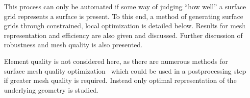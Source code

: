 This process can only be automated if some way of judging ``how well'' a
surface grid represents a surface is present. To this end, a method of
generating surface grids through constrained, local optimization is
detailed below. Results for mesh representation and efficiency are also
given and discussed.  Further discussion of robustness and mesh quality
is also presented.

Element quality is not considered here, as there are numerous methods for 
surface mesh quality 
optimization~\cite{frey1998,garimella2002,garimella2004a,garimella2004b,jiao2005,jiao2006,jiao2011,jiao2013,lopez2008,montenegro2005,montenegro2006,montenegro2008,montenegro2011,roca2012,roca2013,shivanna2010,zhang2009} 
which could be used in a postprocessing step if greater mesh quality is 
required.  Instead only optimal representation of the underlying 
geometry is studied.

